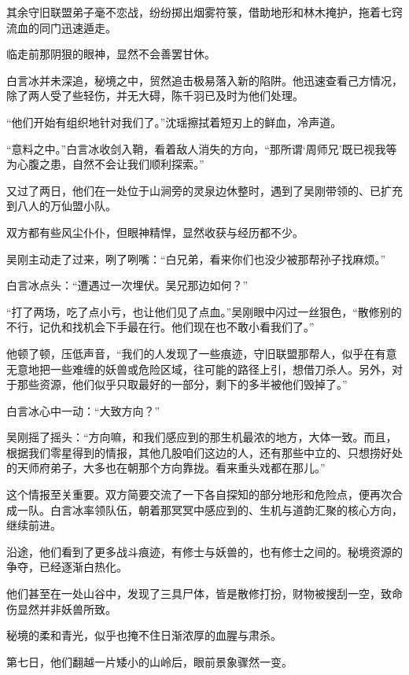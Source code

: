 其余守旧联盟弟子毫不恋战，纷纷掷出烟雾符箓，借助地形和林木掩护，拖着七窍流血的同门迅速遁走。

临走前那阴狠的眼神，显然不会善罢甘休。

白言冰并未深追，秘境之中，贸然追击极易落入新的陷阱。他迅速查看己方情况，除了两人受了些轻伤，并无大碍，陈千羽已及时为他们处理。

“他们开始有组织地针对我们了。”沈瑶擦拭着短刃上的鲜血，冷声道。

“意料之中。”白言冰收剑入鞘，看着敌人消失的方向，“那所谓‘周师兄’既已视我等为心腹之患，自然不会让我们顺利探索。”

\vspace{2em}

又过了两日，他们在一处位于山涧旁的灵泉边休整时，遇到了吴刚带领的、已扩充到八人的万仙盟小队。

双方都有些风尘仆仆，但眼神精悍，显然收获与经历都不少。

吴刚主动走了过来，咧了咧嘴：“白兄弟，看来你们也没少被那帮孙子找麻烦。”

白言冰点头：“遭遇过一次埋伏。吴兄那边如何？”

“打了两场，吃了点小亏，也让他们见了点血。”吴刚眼中闪过一丝狠色，“散修别的不行，记仇和找机会下手最在行。他们现在也不敢小看我们了。”

他顿了顿，压低声音，“我们的人发现了一些痕迹，守旧联盟那帮人，似乎在有意无意地把一些难缠的妖兽或危险区域，往可能的路径上引，想借刀杀人。另外，对于那些资源，他们似乎只取最好的一部分，剩下的多半被他们毁掉了。”

白言冰心中一动：“大致方向？”

吴刚摇了摇头：“方向嘛，和我们感应到的那生机最浓的地方，大体一致。而且，根据我们零星得到的情报，其他几股咱们这边的人，还有那些中立的、只想捞好处的天师府弟子，大多也在朝那个方向靠拢。看来重头戏都在那儿。”

这个情报至关重要。双方简要交流了一下各自探知的部分地形和危险点，便再次合成一队。白言冰率领队伍，朝着那冥冥中感应到的、生机与道韵汇聚的核心方向，继续前进。

沿途，他们看到了更多战斗痕迹，有修士与妖兽的，也有修士之间的。秘境资源的争夺，已经逐渐白热化。

他们甚至在一处山谷中，发现了三具尸体，皆是散修打扮，财物被搜刮一空，致命伤显然并非妖兽所致。

秘境的柔和青光，似乎也掩不住日渐浓厚的血腥与肃杀。

\vspace{2em}

第七日，他们翻越一片矮小的山岭后，眼前景象骤然一变。

